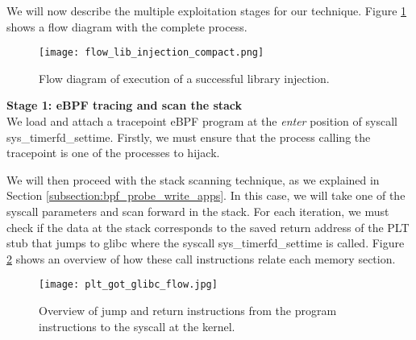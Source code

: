 We will now describe the multiple exploitation stages for our technique. Figure \ref{fig:flow_lib_injection_compact} shows a flow diagram with the complete process.

\begin{figure}[htbp]
	\centering
	\texttt{[image: flow\_lib\_injection\_compact.png]}
	\caption{Flow diagram of execution of a successful library injection.}
	\label{fig:flow_lib_injection_compact}
\end{figure}

\textbf{Stage 1: eBPF tracing and scan the stack}\\
We load and attach a tracepoint eBPF program at the \textit{enter} position of syscall sys\_timerfd\_settime. Firstly, we must ensure that the process calling the tracepoint is one of the processes to hijack.

We will then proceed with the stack scanning technique, as we explained in Section \ref{subsection:bpf_probe_write_apps}. In this case, we will take one of the syscall parameters and scan forward in the stack. For each iteration, we must check if the data at the stack corresponds to the saved return address of the PLT stub that jumps to glibc where the syscall sys\_timerfd\_settime is called. Figure \ref{fig:lib_stage1} shows an overview of how these call instructions relate each memory section. 


\begin{figure}[htbp]
	\centering
	\texttt{[image: plt\_got\_glibc\_flow.jpg]}
	\caption{Overview of jump and return instructions from the program instructions to the syscall at the kernel.}
	\label{fig:lib_stage1}
\end{figure}

